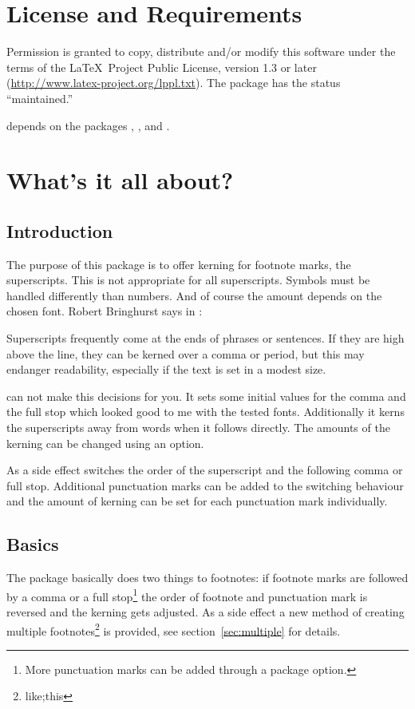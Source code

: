 \documentclass[toc=index,toc=bib]{cnpkgdoc}
\begin{document}
\section{License and Requirements}
Permission is granted to copy, distribute and/or modify this software under the
terms of the \LaTeX\ Project Public License, version 1.3 or later
(\url{http://www.latex-project.org/lppl.txt}). The package has the status
``maintained.''

\fnpct depends on the packages , , 
and .

\section{What's it all about?}
\subsection{Introduction}
The purpose of this package is to offer kerning for footnote marks, \ie the
superscripts. This is not appropriate for all superscripts. Symbols must be
handled differently than numbers. And of course the amount depends on the chosen
font. Robert Bringhurst says in :

\begin{zitat}
 Superscripts frequently come at the ends of phrases or sentences. If they are
 high above the line, they can be kerned over a comma or period, but this may
 endanger readability, especially if the text is set in a modest size.
\end{zitat}

\fnpct can not make this decisions for you. It sets some initial values for the
comma and the full stop which looked good to me with the tested fonts.
Additionally it kerns the superscripts away from words when it follows directly.
The amounts of the kerning can be changed using an option.

As a side effect \fnpct switches the order of the superscript and the following
comma or full stop. Additional punctuation marks can be added to the switching
behaviour and the amount of kerning can be set for each punctuation mark individually.

\subsection{Basics}
The \fnpct package basically does two things to footnotes: if footnote marks are
followed by a comma or a full stop\footnote{More punctuation marks can be added
through a package option.} the order of footnote and punctuation mark is
reversed and the kerning gets adjusted. As a side effect a new method of creating
multiple footnotes\footnote{like;this} is provided, see section~\ref{sec:multiple}
for details.
\end{document}
